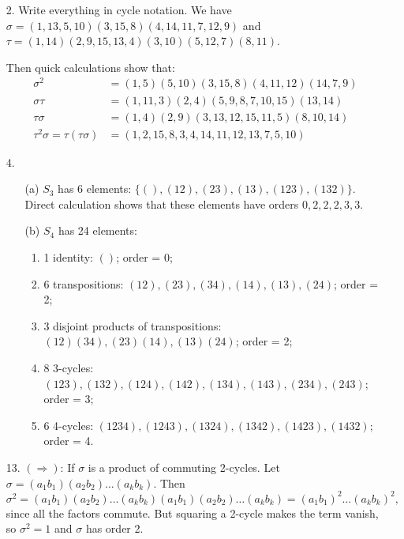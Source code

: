 \documentclass{article}
\begin{document}
\begin{enumerate}
    \item[2.] Write everything in cycle notation. We have $\sigma = (1,13,5,10) (3,15,8) (4,14,11,7,12,9)$ and $\tau = (1,14) (2,9,15,13,4) (3,10) (5,12,7) (8,11)$.
    
    Then quick calculations show that: 
    \begin{align*}
        \sigma^2 &= (1,5) (5,10) (3,15,8) (4,11,12) (14,7,9) \\
        \sigma \tau &= (1,11,3) (2,4) (5,9,8,7,10,15) (13,14) \\
        \tau \sigma &= (1,4) (2,9) (3,13,12,15,11,5) (8,10,14) \\
        \tau^2 \sigma = \tau (\tau\sigma) &= (1,2,15,8,3,4,14,11,12,13,7,5,10)
    \end{align*}

    \item[4.] 
    \begin{enumerate}
        \item [(a)] $S_3$ has 6 elements: $\{(), (12), (23), (13), (123), (132)\}$. Direct calculation shows that these elements have orders $0, 2, 2, 2, 3, 3$.
        \item [(b)] $S_4$ has 24 elements: 
        \begin{enumerate}
            \item 1 identity: $()$; order = 0;
            \item 6 transpositions: $(12), (23), (34), (14), (13), (24)$; order = 2;
            \item 3 disjoint products of transpositions: $(12)(34), (23)(14), (13)(24)$; order = 2;
            \item 8 3-cycles: $(123), (132), (124), (142), (134), (143), (234), (243)$; order = 3;
            \item 6 4-cycles: $(1234), (1243), (1324), (1342), (1423), (1432)$; order = 4.
        \end{enumerate}
    \end{enumerate} 

    \item[13.] $(\Rightarrow)$: If $\sigma$ is a product of commuting 2-cycles. Let $\sigma = (a_1 b_1) (a_2 b_2) \dots (a_k b_k)$. Then \[\sigma^2 = (a_1 b_1) (a_2 b_2) \dots (a_k b_k)(a_1 b_1) (a_2 b_2) \dots (a_k b_k) = (a_1 b_1)^2 \dots (a_k b_k)^2,\] since all the factors commute. But squaring a 2-cycle makes the term vanish, so $\sigma^2 = 1$ and $\sigma$ has order 2.
    

\end{enumerate}
\end{document}
